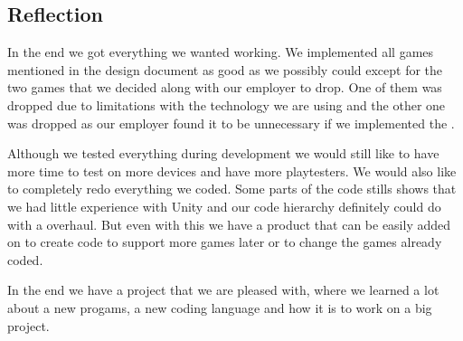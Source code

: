 \subsection{Reflection}
In the end we got everything we wanted working.
We implemented all games mentioned in the design document as good as we possibly could except for the two games that we decided along with our employer to drop.
One of them was dropped due to limitations with the technology we are using and the other one was dropped as our employer found it to be unnecessary if we implemented the .

Although we tested everything during development we would still like to have more time to test on more devices and have more playtesters.
We would also like to completely redo everything we coded.
Some parts of the code stills shows that we had little experience with Unity and our code hierarchy definitely could do with a overhaul.
But even with this we have a product that can be easily added on to create code to support more games later or to change the games already coded.

In the end we have a project that we are pleased with, where we learned a lot about a new progams, a new coding language and how it is to work on a big project.
